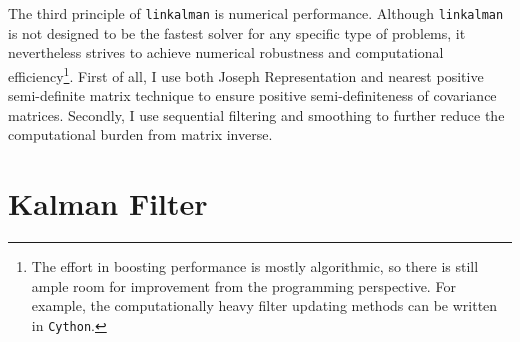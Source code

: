 \documentclass[10pt, titlepage]{article}
\numberwithin{equation}{section}
\begin{document}
The third principle of \texttt{linkalman} is numerical performance. Although \texttt{linkalman} is not designed to be the fastest solver for any specific type of problems, it nevertheless strives to achieve numerical robustness and computational efficiency\footnote{The effort in boosting performance is mostly algorithmic, so there is still ample room for improvement from the programming perspective. For example, the computationally heavy filter updating methods can be written in \texttt{Cython}.}. First of all, I use both Joseph Representation and nearest positive semi-definite matrix technique to ensure positive semi-definiteness of covariance matrices. Secondly, I use sequential filtering and smoothing to further reduce the computational burden from matrix inverse.  

\section{Kalman Filter} \label{sec:filter}
\end{document}
